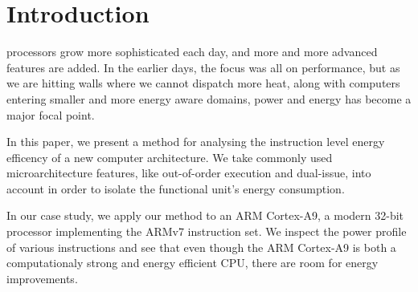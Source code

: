 \section{Introduction}

 processors grow more sophisticated each day, and more
and more advanced features are added. In the earlier days, the focus was all on
performance, but as we are hitting walls where we cannot dispatch more heat,
along with computers entering smaller and more energy aware domains, power and
energy has become a major focal point.

In this paper, we present a method for analysing the instruction level energy
efficency of a new computer architecture. We take commonly used
microarchitecture features, like out-of-order execution and dual-issue, into
account in order to isolate the functional unit's energy consumption.

In our case study, we apply our method to an ARM Cortex-A9, a modern 32-bit
processor implementing the ARMv7 instruction set. We inspect the power profile
of various instructions and see that even though the ARM Cortex-A9 is both a
computationaly strong and energy efficient CPU, there are room for energy
improvements.



